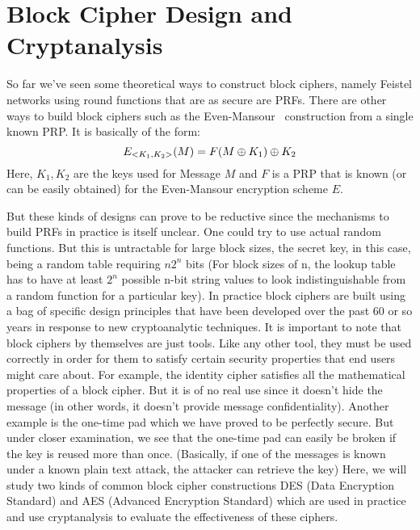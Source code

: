 \section{Block Cipher Design and Cryptanalysis}
\label{sec:cryptanalysis}

So far we've seen some theoretical ways to construct block ciphers, namely Feistel networks using round functions that are as secure are PRFs. There are other ways to build block ciphers such as the Even-Mansour~\cite{EvenMansour} construction from a single known PRP. It is basically of the form: 
\[ E_{<K_1, K_2>}(M) = F(M {\:\oplus\:} K_1) {\:\oplus\:} K_2 \] 
Here, \( K_1, K_2 \) are the keys used for Message \(M\) and \(F\) is a PRP that is known (or can be easily obtained) for the Even-Mansour encryption scheme \(E\). 
\par But these kinds of designs can prove to be reductive since the mechanisms to build PRFs in practice is itself unclear. One could try to use actual random functions. But this is untractable for large block sizes,  the secret key, in this case, being a random table requiring $n2^n$ bits
(For block sizes of n, the lookup table has to have at least $2^n$ possible n-bit string values to look indistinguishable from a random function for
a particular key). \newline
In practice block ciphers are built using a bag of specific design principles that have been developed over the past 60 or so years in response to new cryptoanalytic techniques. It is important to note that block ciphers by themselves are just tools. Like any other tool, they must be used correctly in order for them to satisfy certain security properties that end users might care about. \newline
For example, the identity cipher satisfies all the mathematical properties of a block cipher. But it is of no real use since it doesn't hide
the message (in other words, it doesn't provide message confidentiality). \newline
Another example is the one-time pad which we have proved to be perfectly secure. But under closer examination, we see that the one-time pad can easily be broken if the key is reused more than once. (Basically, if one of the messages is known under a known plain text attack, the attacker can retrieve the key) \newline
Here, we will study two kinds of common block cipher constructions DES (Data Encryption Standard) and AES (Advanced Encryption Standard) which are used in practice and use cryptanalysis to evaluate the effectiveness of these ciphers.\newline \newline

